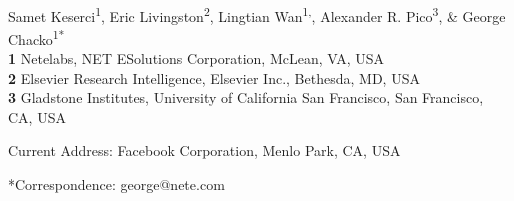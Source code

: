 \documentclass[10pt,letterpaper]{article}
\date{}
\begin{document}
\vspace*{0.2in}

\begin{flushleft}
{\Large
\textbf{} %
}
\newline
\\
Samet Keserci\textsuperscript{1},
Eric Livingston\textsuperscript{2},
Lingtian Wan\textsuperscript{1,\textcurrency},
Alexander R. Pico\textsuperscript{3},
 \& George Chacko\textsuperscript{1*}
\\
\bigskip
\textbf{1} Netelabs, NET ESolutions Corporation, McLean, VA, USA
\\
\textbf{2} Elsevier Research Intelligence, Elsevier Inc., Bethesda, MD, USA
\\
\textbf{3} Gladstone Institutes, University of California San Francisco, San Francisco, CA, USA
\\
\bigskip

% 
%


\textcurrency Current Address: Facebook Corporation, Menlo Park, CA, USA %



*Correspondence: george@nete.com
\end{flushleft}
\end{document}
